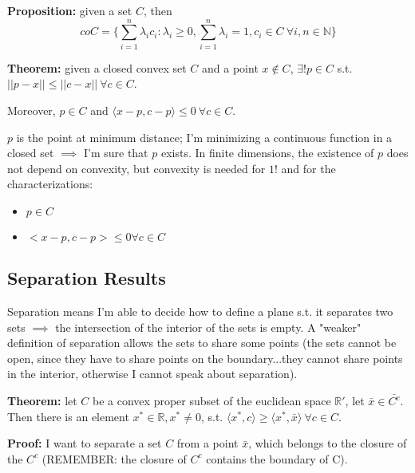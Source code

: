 \bigskip
\noindent \textbf{Proposition:} given a set $C$, then
\[
	coC = \{\sum_{i=1}^n{\lambda_ic_i}: \lambda_i\geq0,
	        \sum_{i=1}^n{\lambda_i} = 1, c_i \in C ~\forall i,n \in 
	        \mathbb{N}\}
\]

\bigskip
\noindent \textbf{Theorem:} given a closed convex set $C$ and a point $x 
\notin C$, $\exists ! p \in C$ s.t. $||p-x|| \leq ||c-x|| ~\forall c \in C$.

\noindent Moreover, $p \in C$ and $\langle x-p, c-p \rangle \leq 0 ~\forall c 
\in C$.

\bigskip
\noindent $p$ is the point at minimum distance; I'm minimizing a continuous 
function in a closed set $\implies$ I'm sure that $p$ exists. In finite
dimensions, the existence of $p$ does not depend on convexity, but 
convexity is needed for $1!$ and for the characterizations:
\begin{itemize}
\item $p \in C$
\item $<x-p, c-p> \leq 0 \forall c \in C$
\end{itemize}

\subsection*{Separation Results}

\noindent Separation means I'm able to decide how to define a plane s.t. it
separates two sets $\implies$ the intersection of the interior of the sets 
is empty. 
A "weaker" definition of separation allows the sets to share some
points (the sets cannot be open, since they have to share points
on the boundary...they cannot share points in the interior, otherwise
I cannot speak about separation).

\bigskip
\noindent \textbf{Theorem:} let $C$ be a convex proper subset of the euclidean 
space $\mathbb{R}'$, let $\bar{x} \in \bar{C^c}$. Then there is an element 
$x^* \in \mathbb{R}, x^* \neq 0$, s.t. $\langle x^*,c \rangle \geq
\langle x^*,\bar{x}\rangle ~\forall c \in C$.

\bigskip
\noindent \textbf{Proof:} I want to separate a set $C$ from a point $\bar{x}$, 
which belongs to the closure of the $C^c$ (REMEMBER: the closure of $C^c$ 
contains the boundary of C).

